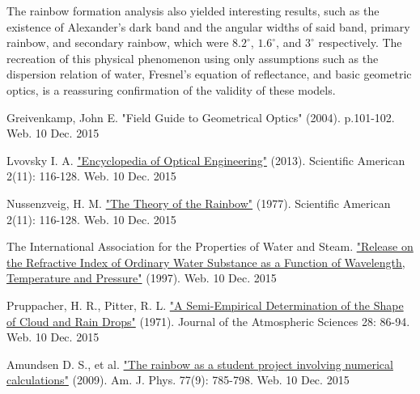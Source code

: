 \documentclass{article}
\begin{document}
The rainbow formation analysis also yielded interesting results, such as the existence of Alexander's dark band and the angular widths of said band, primary rainbow, and secondary rainbow, which were $8.2^{\circ}$, $1.6^{\circ}$, and $3^{\circ}$ respectively. The recreation of this physical phenomenon using only assumptions such as the dispersion relation of water, Fresnel's equation of reflectance, and basic geometric optics, is a reassuring confirmation of the validity of these models.


\begin{thebibliography}{1}
 Greivenkamp, John E. "Field Guide to Geometrical Optics" (2004). p.101-102. Web. 10 Dec. 2015

 Lvovsky I. A. \href{http://iqst.ca/quantech/pubs/2013/fresnel-eoe.pdf}{"Encyclopedia of Optical Engineering"} (2013). Scientific American 2(11): 116-128. Web. 10 Dec. 2015

 Nussenzveig, H. M. \href{http://bionics.seas.ucla.edu/education/MAE_182A/Airy_Eq_Rainbows.pdf}{"The Theory of the Rainbow"} (1977). Scientific American 2(11): 116-128. Web. 10 Dec. 2015

 The International Association for the Properties of Water and Steam. \href{http://www.iapws.org/relguide/rindex.pdf}{"Release on the Refractive Index of Ordinary Water Substance as a Function of Wavelength, Temperature and Pressure"} (1997). Web. 10 Dec. 2015

 Pruppacher, H. R., Pitter, R. L. \href{http://journals.ametsoc.org/doi/pdf/10.1175/1520-0469(1971)028\%3C0086\%3AASEDOT\%3E2.0.CO\%3B2}{"A Semi-Empirical Determination of the Shape of Cloud and Rain Drops"} (1971). Journal of the Atmospheric Sciences 28: 86-94. Web. 10 Dec. 2015

 Amundsen D. S., et al. \href{http://www.mn.uio.no/english/about/collaboration/cse/publications/AJP000795.pdf}{"The rainbow as a student project involving numerical calculations"} (2009). Am. J. Phys. 77(9): 785-798. Web. 10 Dec. 2015


\end{thebibliography}
\end{document}
